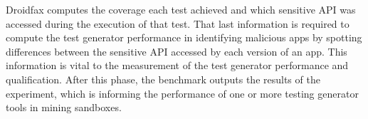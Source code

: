 Droidfax computes the coverage each test achieved and which sensitive API was accessed during the execution of that test. That last information is required to compute the test generator performance in identifying malicious apps by spotting differences between the sensitive API accessed by each version of an app. This information is vital to the measurement of the test generator performance and qualification. After this phase, the benchmark outputs the results of the experiment, which is informing the performance of one or more testing generator tools in mining sandboxes.